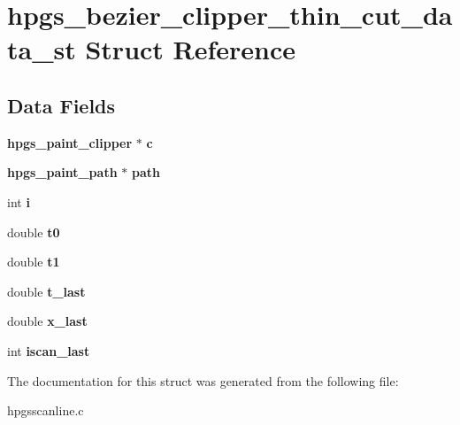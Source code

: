 \section{hpgs\_\-bezier\_\-clipper\_\-thin\_\-cut\_\-data\_\-st Struct Reference}
\label{structhpgs__bezier__clipper__thin__cut__data__st}
\subsection*{Data Fields}
\begin{DoxyCompactItemize}
\item 
{\bf hpgs\_\-paint\_\-clipper} $\ast$ {\bfseries c}\label{structhpgs__bezier__clipper__thin__cut__data__st_ad4ab5422cc2033e38725b2c938683409}

\item 
{\bf hpgs\_\-paint\_\-path} $\ast$ {\bfseries path}\label{structhpgs__bezier__clipper__thin__cut__data__st_ab5804032e0775c810d2d055e2fc98458}

\item 
int {\bfseries i}\label{structhpgs__bezier__clipper__thin__cut__data__st_a380b46528c49f6f7b4ebe8981d5a9b4f}

\item 
double {\bfseries t0}\label{structhpgs__bezier__clipper__thin__cut__data__st_a2ce34245b8f68a123cdba572cbacac75}

\item 
double {\bfseries t1}\label{structhpgs__bezier__clipper__thin__cut__data__st_a70c7e232bb352f6891695fee56f0fc0e}

\item 
double {\bfseries t\_\-last}\label{structhpgs__bezier__clipper__thin__cut__data__st_a662531f12be313efc07657e2ea9e1016}

\item 
double {\bfseries x\_\-last}\label{structhpgs__bezier__clipper__thin__cut__data__st_a10e589ecc42c1c27b5224ed5c895d3f0}

\item 
int {\bfseries iscan\_\-last}\label{structhpgs__bezier__clipper__thin__cut__data__st_ab06ad915a016e2fd2fb0d02cd67c7776}

\end{DoxyCompactItemize}


The documentation for this struct was generated from the following file:\begin{DoxyCompactItemize}
\item 
hpgsscanline.c\end{DoxyCompactItemize}
